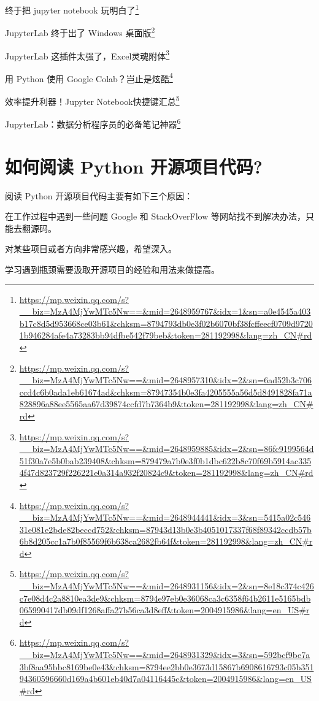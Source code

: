 \documentclass[]{ctexbook}
\renewcommand{\href}[2]{#2\footnote{\url{#1}}}
\begin{document}
\href{https://mp.weixin.qq.com/s?__biz=MzA4MjYwMTc5Nw==\&mid=2648959767\&idx=1\&sn=a0e4545a403b17c8d5d953668ce03b61\&chksm=8794793db0e3f02b6070bf38fcffeecf0709d97201b946284afe4a73283bb94dfbe542f79beb\&token=281192998\&lang=zh_CN\#rd}{终于把 jupyter notebook 玩明白了}

\href{https://mp.weixin.qq.com/s?__biz=MzA4MjYwMTc5Nw==\&mid=2648957310\&idx=2\&sn=6ad52b3c706ccd4c6b0ada1eb61674ad\&chksm=87947354b0e3fa4205555a56d5d8491828fa71a828896a88ee5565aa67d39874ccfd7b7364b9\&token=281192998\&lang=zh_CN\#rd}{JupyterLab 终于出了 Windows 桌面版}

\href{https://mp.weixin.qq.com/s?__biz=MzA4MjYwMTc5Nw==\&mid=2648959885\&idx=2\&sn=86fc9199564d51f30a7e5b0bab239408\&chksm=879479a7b0e3f0b1dbc622b8c70f69b5914ac3354f47d823729f226221e0a314a932f20824c9\&token=281192998\&lang=zh_CN\#rd}{JupyterLab 这插件太强了，Excel灵魂附体}

\href{https://mp.weixin.qq.com/s?__biz=MzA4MjYwMTc5Nw==\&mid=2648944441\&idx=3\&sn=5415a02c54631e081e2bde82beccd752\&chksm=87943d13b0e3b4051017337f68f89342ccdb57b6b8d205cc1a7b0f85569f6b638ca2682fb64f\&token=281192998\&lang=zh_CN\#rd}{用 Python 使用 Google Colab？岂止是炫酷}

\href{https://mp.weixin.qq.com/s?__biz=MzA4MjYwMTc5Nw==\&mid=2648931156\&idx=2\&sn=8e18c374c426c7e08d4c2a8810ea3de9\&chksm=8794e97eb0e36068ca3c6358f64b2611e5165bdb065990417db09df1268affa27b56ca3d8eff\&token=2004915986\&lang=en_US\#rd}{效率提升利器！Jupyter Notebook快捷键汇总}

\href{https://mp.weixin.qq.com/s?__biz=MzA4MjYwMTc5Nw==\&mid=2648931329\&idx=3\&sn=592bcf9be7a3bf8aa95bbc8169be0e43\&chksm=8794ee2bb0e3673d15867b6908616793c05b35194360596660d169a4b601eb40d7a04116445c\&token=2004915986\&lang=en_US\#rd}{JupyterLab：数据分析程序员的必备笔记神器}

\hypertarget{ux5982ux4f55ux9605ux8bfb-python-ux5f00ux6e90ux9879ux76eeux4ee3ux7801}{%
\section{如何阅读 Python 开源项目代码?}\label{ux5982ux4f55ux9605ux8bfb-python-ux5f00ux6e90ux9879ux76eeux4ee3ux7801}}

阅读 Python 开源项目代码主要有如下三个原因：

在工作过程中遇到一些问题 Google 和 StackOverFlow 等网站找不到解决办法，只能去翻源码。

对某些项目或者方向非常感兴趣，希望深入。

学习遇到瓶颈需要汲取开源项目的经验和用法来做提高。
\end{document}
